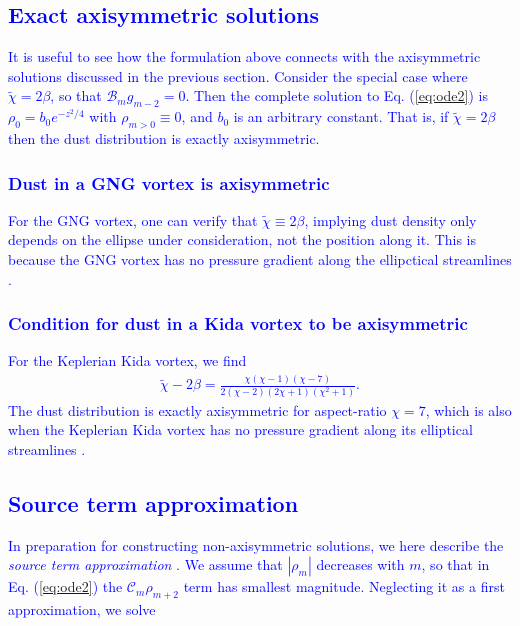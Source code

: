 \documentclass[apj]{emulateapj}
\def\blue#1{\textcolor{blue}{#1}}
\newcommand{\Eq}[1]{Eq. (\ref{#1})}
\newcommand{\eq}[1]{\Eq{#1}}
\newcommand{\tilchi}{\tilde\chi}
\begin{document}
\blue{
\subsection{Exact axisymmetric solutions}
It is useful to see how the formulation above connects with the  axisymmetric solutions discussed in the previous section.  Consider the special case where $\tilchi = 2\beta$, so that 
$\mathcal{B}_mg_{m-2} = 0.$
Then the complete solution to \eq{eq:ode2} is $\rho_0 = b_0e^{-z^2/4}$ with $\rho_{m>0} \equiv 0$, and $b_0$ is an arbitrary constant. That is, if $\tilchi=2\beta$ then the dust distribution is exactly axisymmetric. 
}
\blue{
\subsubsection{Dust in a GNG vortex is axisymmetric}
For the GNG vortex, one can verify that $\tilchi\equiv 2\beta$, implying dust density only depends on the ellipse under consideration, not the position along it. This is because the GNG vortex has no pressure gradient along the ellipctical streamlines \citep{Chang-Oishi10}. 
}
\blue{
\subsubsection{Condition for dust in a Kida vortex to be axisymmetric}
For the Keplerian Kida vortex, we find
\begin{align}
\tilchi - 2\beta = \frac{\chi(\chi-1)(\chi-7)}{2(\chi-2)(2\chi+1)(\chi^2+1)}.
\end{align}
The dust distribution is exactly axisymmetric for aspect-ratio $\chi=7$, which is also when the Keplerian Kida vortex has no pressure gradient along its elliptical streamlines \citep{Chang-Oishi10}. 
}
\blue{
\subsection{Source term approximation}
In preparation for constructing non-axisymmetric solutions, we here describe the \emph{source term approximation} \citep{Zhang06}.
We assume that $|\rho_m|$ decreases with $m$, so that in \eq{eq:ode2} the $\mathcal{C}_m\rho_{m+2}$ term has smallest magnitude.  Neglecting it as a first approximation, we solve 
}
\end{document}
